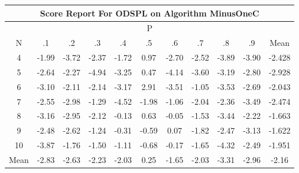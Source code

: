 \documentclass[11pt,a4paper]{report}
\begin{document}
\begin{longtable}{ | c || c | c | c | c | c | c | c | c | c || c |}
\hline
\multicolumn{11}{|c|}{ Score Report For ODSPL on Algorithm MinusOneC} \\
\hline
\multicolumn{11}{|c|}{ P } \\
\hline
N & .1 & .2 & .3 & .4 & .5 & .6 & .7 & .8 & .9 & Mean\\
 \hline
 \hline
 \endhead
  4 &  \cellcolor[HTML]{FFCFCF} -1.99 &  \cellcolor[HTML]{FF9F9F} -3.72 &  \cellcolor[HTML]{FFC7C7} -2.37 &  \cellcolor[HTML]{FFD7D7} -1.72 &  \cellcolor[HTML]{E7E7FF} 0.97 &  \cellcolor[HTML]{FFB7B7} -2.70 &  \cellcolor[HTML]{FFBFBF} -2.52 &  \cellcolor[HTML]{FF9F9F} -3.89 &  \cellcolor[HTML]{FF9F9F} -3.90 & -2.428 \\
  5 &  \cellcolor[HTML]{FFBFBF} -2.64 &  \cellcolor[HTML]{FFC7C7} -2.27 &  \cellcolor[HTML]{FF8080} -4.94 &  \cellcolor[HTML]{FFAFAF} -3.25 &  \cellcolor[HTML]{F7F7FF} 0.47 &  \cellcolor[HTML]{FF9797} -4.14 &  \cellcolor[HTML]{FFA7A7} -3.60 &  \cellcolor[HTML]{FFAFAF} -3.19 &  \cellcolor[HTML]{FFB7B7} -2.80 & -2.928 \\
  6 &  \cellcolor[HTML]{FFAFAF} -3.10 &  \cellcolor[HTML]{FFC7C7} -2.11 &  \cellcolor[HTML]{FFC7C7} -2.14 &  \cellcolor[HTML]{FFAFAF} -3.17 &  \cellcolor[HTML]{B7B7FF} 2.91 &  \cellcolor[HTML]{FFA7A7} -3.51 &  \cellcolor[HTML]{FFE7E7} -1.05 &  \cellcolor[HTML]{FFA7A7} -3.53 &  \cellcolor[HTML]{FFBFBF} -2.69 & -2.043 \\
  7 &  \cellcolor[HTML]{FFBFBF} -2.55 &  \cellcolor[HTML]{FFB7B7} -2.98 &  \cellcolor[HTML]{FFDFDF} -1.29 &  \cellcolor[HTML]{FF8F8F} -4.52 &  \cellcolor[HTML]{FFCFCF} -1.98 &  \cellcolor[HTML]{FFE7E7} -1.06 &  \cellcolor[HTML]{FFCFCF} -2.04 &  \cellcolor[HTML]{FFC7C7} -2.36 &  \cellcolor[HTML]{FFA7A7} -3.49 & -2.474 \\
  8 &  \cellcolor[HTML]{FFAFAF} -3.16 &  \cellcolor[HTML]{FFB7B7} -2.95 &  \cellcolor[HTML]{FFC7C7} -2.12 &  \cellcolor[HTML]{FFFFFF} -0.13 &  \cellcolor[HTML]{EFEFFF} 0.63 &  \cellcolor[HTML]{FFFFFF} -0.05 &  \cellcolor[HTML]{FFD7D7} -1.53 &  \cellcolor[HTML]{FFA7A7} -3.44 &  \cellcolor[HTML]{FFC7C7} -2.22 & -1.663 \\
  9 &  \cellcolor[HTML]{FFBFBF} -2.48 &  \cellcolor[HTML]{FFBFBF} -2.62 &  \cellcolor[HTML]{FFDFDF} -1.24 &  \cellcolor[HTML]{FFF7F7} -0.31 &  \cellcolor[HTML]{FFEFEF} -0.59 &  \cellcolor[HTML]{FFFFFF} 0.07 &  \cellcolor[HTML]{FFCFCF} -1.82 &  \cellcolor[HTML]{FFBFBF} -2.47 &  \cellcolor[HTML]{FFAFAF} -3.13 & -1.622 \\
  10 &  \cellcolor[HTML]{FF9F9F} -3.87 &  \cellcolor[HTML]{FFCFCF} -1.76 &  \cellcolor[HTML]{FFD7D7} -1.50 &  \cellcolor[HTML]{FFE7E7} -1.11 &  \cellcolor[HTML]{FFEFEF} -0.68 &  \cellcolor[HTML]{FFF7F7} -0.17 &  \cellcolor[HTML]{FFD7D7} -1.65 &  \cellcolor[HTML]{FF8F8F} -4.32 &  \cellcolor[HTML]{FFBFBF} -2.49 & -1.951 \\
 \hline
 \hline
Mean &  \cellcolor[HTML]{FFB7B7} -2.83 &  \cellcolor[HTML]{FFBFBF} -2.63 &  \cellcolor[HTML]{FFC7C7} -2.23 &  \cellcolor[HTML]{FFCFCF} -2.03 &  \cellcolor[HTML]{F7F7FF} 0.25 &  \cellcolor[HTML]{FFD7D7} -1.65 &  \cellcolor[HTML]{FFCFCF} -2.03 &  \cellcolor[HTML]{FFAFAF} -3.31 &  \cellcolor[HTML]{FFB7B7} -2.96 &  \cellcolor[HTML]{FFC7C7} -2.16
\end{longtable}
\end{document}
